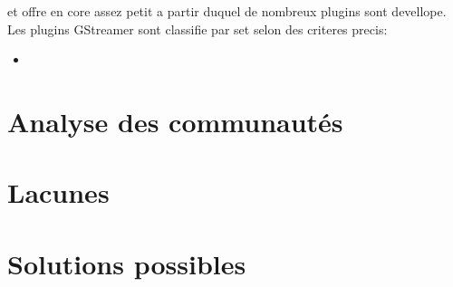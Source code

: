 et offre en core assez petit a partir duquel de nombreux plugins sont
devellope. Les plugins GStreamer sont classifie par set selon des
criteres precis:

\begin{itemize}
  \item {}
\end{itemize}


\subsection {}

\newpage \section{Analyse des communautés}

\newpage \section{Lacunes}

\newpage \section{Solutions possibles}
